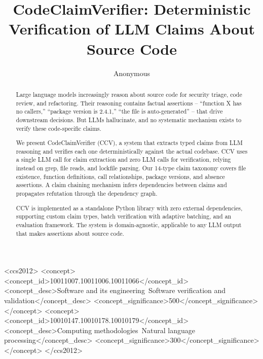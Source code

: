 \documentclass[sigconf,review,anonymous]{acmart}
\begin{document}
\title{CodeClaimVerifier: Deterministic Verification of LLM Claims About Source Code}

\author{Anonymous}

\begin{abstract}
Large language models increasingly reason about source code for security triage, code review, and refactoring. Their reasoning contains factual assertions -- ``function X has no callers,'' ``package version is 2.4.1,'' ``the file is auto-generated'' -- that drive downstream decisions. But LLMs hallucinate, and no systematic mechanism exists to verify these code-specific claims.

We present CodeClaimVerifier (CCV), a system that extracts typed claims from LLM reasoning and verifies each one deterministically against the actual codebase. CCV uses a single LLM call for claim extraction and zero LLM calls for verification, relying instead on grep, file reads, and lockfile parsing. Our 14-type claim taxonomy covers file existence, function definitions, call relationships, package versions, and absence assertions. A claim chaining mechanism infers dependencies between claims and propagates refutation through the dependency graph.


CCV is implemented as a standalone Python library with zero external dependencies, supporting custom claim types, batch verification with adaptive batching, and an evaluation framework. The system is domain-agnostic, applicable to any LLM output that makes assertions about source code.
\end{abstract}

\begin{CCSXML}
<ccs2012>
<concept>
<concept_id>10011007.10011006.10011066</concept_id>
<concept_desc>Software and its engineering~Software verification and validation</concept_desc>
<concept_significance>500</concept_significance>
</concept>
<concept>
<concept_id>10010147.10010178.10010179</concept_id>
<concept_desc>Computing methodologies~Natural language processing</concept_desc>
<concept_significance>300</concept_significance>
</concept>
</ccs2012>
\end{CCSXML}

\end{document}
